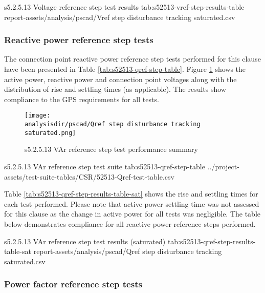 \documentclass{../grid-link-report}
\newcommand{\projectassetsdir}{../project-assets}
\newcommand{\analysisdir}{report-assets/analysis}
\begin{document}
	{
		\fontsize{6.5}{11}\selectfont
		\autoscaledlongtable
		{s5.2.5.13 Voltage reference step test results}
		{tab:s52513-vref-step-results-table}
		{report-assets/analysis/pscad/Vref step disturbance tracking saturated.csv}
	}
	
	\subsubsection{Reactive power reference step tests}
	
	The connection point reactive power reference step tests performed for this clause have been presented in Table \ref{tab:s52513-qref-step-table}. Figure \ref{fig:s52513-qref-step-saturated-summary-plot} shows the active power, reactive power and connection point voltages along with the distribution of rise and settling times (as applicable). The results show compliance to the GPS requirements for all tests.
	
	
	\begin{figure}[H]
		\centering
		\texttt{[image: \\analysisdir/pscad/Qref step disturbance tracking saturated.png]}
		\caption{s5.2.5.13 VAr reference step test performance summary}
		\label{fig:s52513-qref-step-saturated-summary-plot}
	\end{figure}
	

	
	{
		\fontsize{7}{9}\selectfont
		\autoscaledlongtable
		{s5.2.5.13 VAr reference step test suite}
		{tab:s52513-qref-step-table}
		{\projectassetsdir/test-suite-tables/CSR/52513-Qref-test-table.csv}
	}

	
	Table \ref{tab:s52513-qref-step-results-table-sat} shows the rise and settling times for each test performed. Please note that active power settling time was not assessed for this clause as the change in active power for all tests was negligible. The table below demonstrates compliance for all reactive power reference steps performed.
	
	{
		\fontsize{6.5}{9}\selectfont
			\autoscaledlongtable%
			{s5.2.5.13 VAr reference step test results (saturated)}%
			{tab:s52513-qref-step-results-table-sat}%
			{report-assets/analysis/pscad/Qref step disturbance tracking saturated.csv}%
	}
	

	
	\subsubsection{Power factor reference step tests}
	
\end{document}
